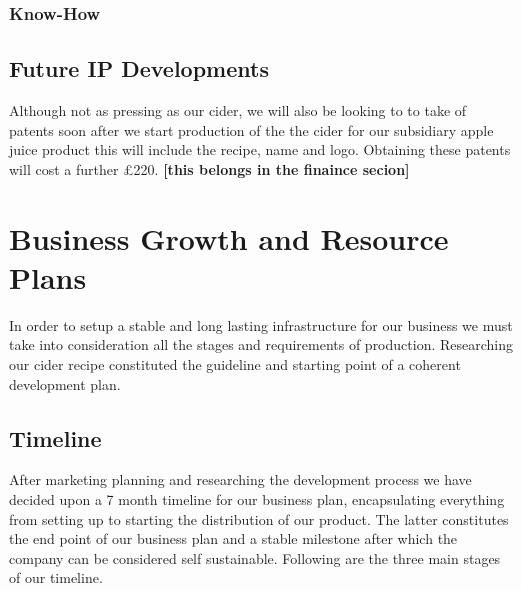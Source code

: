 \documentclass[11pt]{article}
\begin{document}
    \subsubsection{Know-How}

  \subsection{Future IP Developments}
Although not as pressing as our cider, we will also be looking to to take of patents soon after we start production of the the cider for our subsidiary apple juice product this will include the recipe, name and logo. Obtaining these patents will cost a further £220. \textbf{[this belongs in the finaince secion]}

\newpage
\section{Business Growth and Resource Plans}
In order to setup a stable and long lasting infrastructure for our business we 
must take into consideration all the stages and requirements of production. 
Researching our cider recipe constituted the guideline and starting point of a 
coherent development plan.

  \subsection{Timeline}
After marketing planning and researching the development process we have decided
upon a 7 month timeline for our business plan, encapsulating everything from
setting up to starting the distribution of our product. The latter constitutes
the end point of our business plan and a stable milestone after which the
company can be considered self sustainable. Following are the three main stages
of our timeline.
\end{document}
